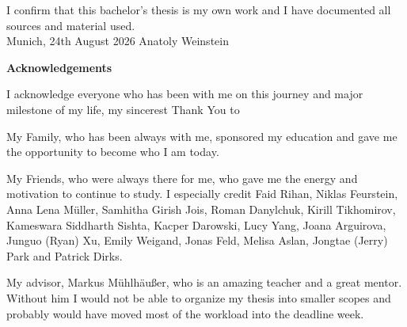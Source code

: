 \documentclass[11pt,
               a4paper,
               bibtotoc,
               idxtotoc,
               headsepline,
               footsepline,
               footexclude,
               BCOR12mm,
               DIV13,
               openany,   %
               ]
               {scrbook}
\def\doctype{Bachelor's Thesis\xspace}
\def\author{Anatoly Weinstein}
\def\date{24th August 2026}
\begin{document}
\addtolength{\hoffset}{\bcorcor}
\newpage


\cleardoubleemptypage

\thispagestyle{empty}
\vspace*{0.7\textheight}
\noindent
I confirm that this \MakeLowercase{\doctype} is my own work and I have documented all sources and material used.\\

\vspace{15mm}
\noindent
Munich, \date \hspace{5cm} \author
\cleardoubleemptypage


{}
\vspace*{2cm}
\begin{center}
    {\Large \bf Acknowledgements}
\end{center}
\vspace{1cm}

I acknowledge everyone who has been with me on this journey and major milestone of my life, my sincerest Thank You to

My Family, who has been always with me, sponsored my education and gave me the opportunity to become who I am today.

My Friends, who were always there for me, who gave me the energy and motivation to continue to study. I especially credit Faid Rihan, Niklas Feurstein, Anna Lena Müller, Samhitha Girish Jois, Roman Danylchuk, Kirill Tikhomirov, Kameswara Siddharth Sishta, Kacper Darowski, Lucy Yang, Joana Arguirova, Junguo (Ryan) Xu, Emily Weigand, Jonas Feld, Melisa Aslan, Jongtae (Jerry) Park and Patrick Dirks.

My advisor, Markus Mühlhäußer, who is an amazing teacher and a great mentor. Without him I would not be able to organize my thesis into smaller scopes and probably would have moved most of the workload into the deadline week.
\end{document}
